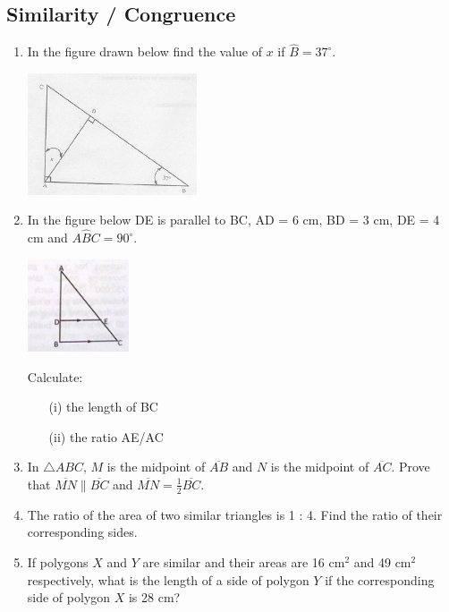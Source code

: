 	\subsection{Similarity / Congruence}
\begin{enumerate}

	\item In the figure drawn below find the value of $x$ if $\hat{B} = 37^\circ$.
	
	\begin{center}
	\includegraphics[width=5cm]{./img/sim1.jpg}
	\end{center}
	
	\item In the figure below DE is parallel to BC, AD = 6 cm, BD = 3 cm, DE = 4 cm and $A\hat{B}C = 90^\circ$.
	
	\begin{center}
	\includegraphics[width=3cm]{./img/sim2.jpg}
	\end{center}
	
	Calculate:
	\begin{itemize}
	\item[(i)] the length of BC
	\item[(ii)] the ratio AE\slash AC
	\end{itemize}
	
	\item In $\bigtriangleup ABC$, $M$ is the midpoint of $\overline{AB}$ and $N$ is the midpoint of $\overline{AC}$. Prove that $\overline{MN} \parallel \overline{BC}$ and $\overline{MN} = \frac{1}{2}\overline{BC}$.
	
	\item The ratio of the area of two similar triangles is 1 : 4. Find the ratio of their corresponding sides.
	
	\item If polygons $X$ and $Y$ are similar and their areas are 16 cm$^2$ and 49 cm$^2$ respectively, what is the length of a side of polygon $Y$ if the corresponding side of polygon $X$ is 28 cm?
	

\end{enumerate}
